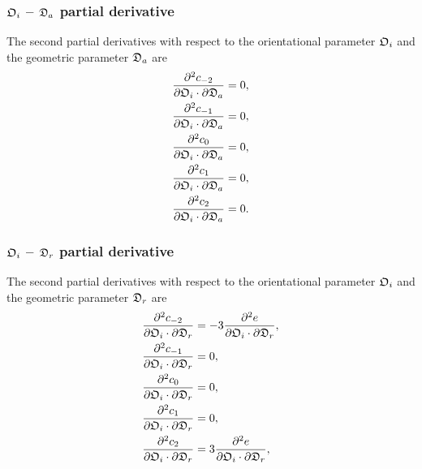 \subsubsection{$\mathfrak{O}_i$ -- $\mathfrak{D}_a$ partial derivative}

The second partial derivatives with respect to the orientational parameter $\mathfrak{O}_i$ and the geometric parameter $\mathfrak{D}_a$ are
\begin{subequations}
\begin{align}
    \frac{\partial^2 c_{-2}}{\partial \mathfrak{O}_i \cdot \partial \mathfrak{D}_a}  &=  0, \\
    \frac{\partial^2 c_{-1}}{\partial \mathfrak{O}_i \cdot \partial \mathfrak{D}_a} &= 0, \\
    \frac{\partial^2 c_{0}}{\partial \mathfrak{O}_i \cdot \partial \mathfrak{D}_a}  &= 0, \\
    \frac{\partial^2 c_{1}}{\partial \mathfrak{O}_i \cdot \partial \mathfrak{D}_a}  &= 0, \\
    \frac{\partial^2 c_{2}}{\partial \mathfrak{O}_i \cdot \partial \mathfrak{D}_a}  &= 0.
\end{align}
\end{subequations}



\subsubsection{$\mathfrak{O}_i$ -- $\mathfrak{D}_r$ partial derivative}

The second partial derivatives with respect to the orientational parameter $\mathfrak{O}_i$ and the geometric parameter $\mathfrak{D}_r$ are
\begin{subequations}
\begin{align}
    \frac{\partial^2 c_{-2}}{\partial \mathfrak{O}_i \cdot \partial \mathfrak{D}_r}  &=  -3 \frac{\partial^2 e}{\partial \mathfrak{O}_i \cdot \partial \mathfrak{D}_r}, \\
    \frac{\partial^2 c_{-1}}{\partial \mathfrak{O}_i \cdot \partial \mathfrak{D}_r} &= 0, \\
    \frac{\partial^2 c_{0}}{\partial \mathfrak{O}_i \cdot \partial \mathfrak{D}_r}  &= 0, \\
    \frac{\partial^2 c_{1}}{\partial \mathfrak{O}_i \cdot \partial \mathfrak{D}_r}  &= 0, \\
    \frac{\partial^2 c_{2}}{\partial \mathfrak{O}_i \cdot \partial \mathfrak{D}_r}  &= 3 \frac{\partial^2 e}{\partial \mathfrak{O}_i \cdot \partial \mathfrak{D}_r},
\end{align}
\end{subequations}

